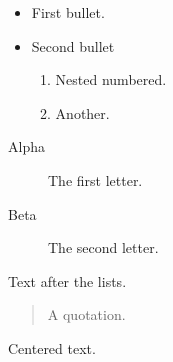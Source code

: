 
\begin{itemize}
\item First bullet.
\item Second bullet
  \begin{enumerate}
  \item Nested numbered.
  \item Another.
  \end{enumerate}
\end{itemize}
\begin{description}
\item[Alpha] The first letter.
\item[Beta] The second letter.
\end{description}
Text after the lists.
\begin{quote}
A quotation.
\end{quote}
\begin{center}
Centered text.
\end{center}

